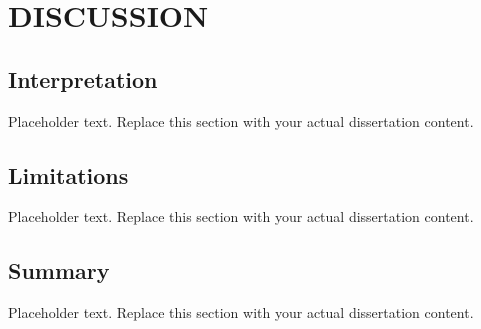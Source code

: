 
\chapter{DISCUSSION}

\section{Interpretation}
Placeholder text. Replace this section with your actual dissertation content.

\section{Limitations}
Placeholder text. Replace this section with your actual dissertation content.

\section{Summary}
Placeholder text. Replace this section with your actual dissertation content.
